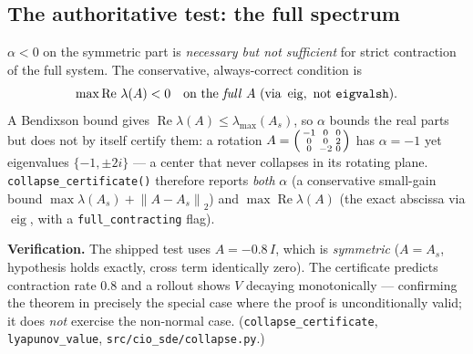 \documentclass[11pt]{article}
\theoremstyle{definition}
\newcommand{\norm}[1]{\left\lVert#1\right\rVert}
\DeclareMathOperator*{\Real}{Re}
\DeclareMathOperator{\eig}{eig}
\begin{document}
\subsection{The authoritative test: the full spectrum}
$\alpha<0$ on the symmetric part is \emph{necessary but not sufficient} for strict
contraction of the full system. The conservative, always-correct condition is
\begin{equation}
\max \Real\,\lambda(A) < 0 \quad\text{on the \emph{full} } A
\ (\text{via } \eig, \text{ not } \texttt{eigvalsh}).
\end{equation}
A Bendixson bound gives $\Real\lambda(A)\le\lambda_{\max}(A_s)$, so $\alpha$ bounds the
real parts but does not by itself certify them: a rotation
$A=\begin{psmallmatrix}-1&0&0\\0&0&2\\0&-2&0\end{psmallmatrix}$ has $\alpha=-1$ yet
eigenvalues $\{-1,\pm 2i\}$ --- a center that never collapses in its rotating plane.
\texttt{collapse\_certificate()} therefore reports \emph{both} $\alpha$ (a conservative
small-gain bound $\max\lambda(A_s)+\norm{A-A_s}_2$) and $\max\Real\lambda(A)$ (the exact
abscissa via $\eig$, with a \texttt{full\_contracting} flag).

\begin{verifybox}
\textbf{Verification.} The shipped test uses $A=-0.8\,I$, which is \emph{symmetric}
($A=A_s$, hypothesis holds exactly, cross term identically zero). The certificate predicts
contraction rate $0.8$ and a rollout shows $V$ decaying monotonically --- confirming the
theorem in precisely the special case where the proof is unconditionally valid; it does
\emph{not} exercise the non-normal case.
(\texttt{collapse\_certificate}, \texttt{lyapunov\_value}, \texttt{src/cio\_sde/collapse.py}.)
\end{verifybox}

\end{document}
